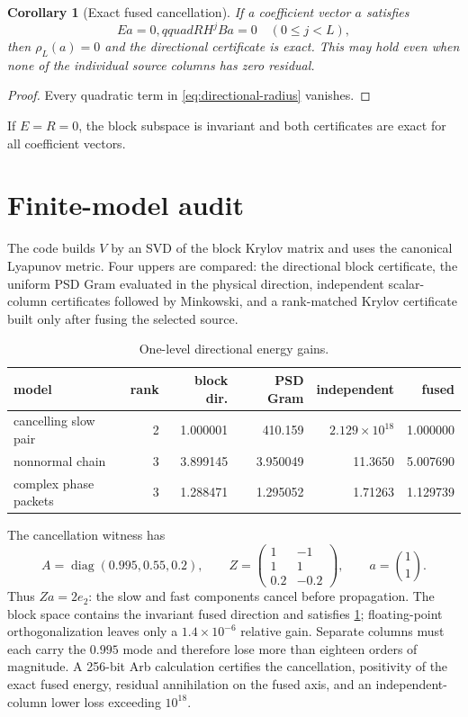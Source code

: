 \documentclass[11pt]{article}
\newtheorem{corollary}[theorem]{Corollary}
\begin{document}
\begin{corollary}[Exact fused cancellation]
\label{cor:cancellation}
If a coefficient vector $a$ satisfies
\begin{equation}
 Ea=0,qquad RH^jBa=0\quad(0\le j<L),
 \label{eq:annihilation}
\end{equation}
then $\rho_L(a)=0$ and the directional certificate is exact.  This may hold
even when none of the individual source columns has zero residual.
\end{corollary}

\begin{proof}
Every quadratic term in \eqref{eq:directional-radius} vanishes.
\end{proof}

If $E=R=0$, the block subspace is invariant and both certificates are exact
for all coefficient vectors.

\section{Finite-model audit}
\label{sec:audit}

The code builds $V$ by an SVD of the block Krylov matrix and uses the
canonical Lyapunov metric.  Four uppers are compared: the directional block
certificate, the uniform PSD Gram evaluated in the physical direction,
independent scalar-column certificates followed by Minkowski, and a
rank-matched Krylov certificate built only after fusing the selected source.

\begin{table}[H]
\centering
\caption{One-level directional energy gains.}
\label{tab:gains}
\begin{tabular}{lrrrrr}
\toprule
model & rank & block dir. & PSD Gram & independent & fused\\
\midrule
cancelling slow pair & 2 & 1.000001 & 410.159 & $2.129\times10^{18}$ & 1.000000\\
nonnormal chain      & 3 & 3.899145 & 3.950049 & 11.3650 & 5.007690\\
complex phase packets& 3 & 1.288471 & 1.295052 & 1.71263 & 1.129739\\
\bottomrule
\end{tabular}
\end{table}

The cancellation witness has
\[
 A=\operatorname{diag}(0.995,0.55,0.2),\qquad
 Z=\begin{pmatrix}1&-1\\1&1\\0.2&-0.2\end{pmatrix},\qquad
 a=\binom11.
\]
Thus $Za=2e_2$: the slow and fast components cancel before propagation.
The block space contains the invariant fused direction and satisfies
\cref{cor:cancellation}; floating-point orthogonalization leaves only a
$1.4\times10^{-6}$ relative gain.  Separate columns must each carry the
$0.995$ mode and therefore lose more than eighteen orders of magnitude.  A
256-bit Arb calculation certifies the cancellation, positivity of the exact
fused energy, residual annihilation on the fused axis, and an independent-
column lower loss exceeding $10^{18}$.
\end{document}

